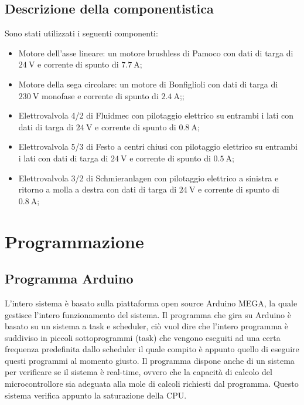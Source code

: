 \documentclass{report}
\begin{document}
\section{Descrizione della componentistica}
Sono stati utilizzati i seguenti componenti:
\begin{itemize}
\item Motore dell'asse lineare: un motore brushless di Pamoco con dati di targa di $\SI{24}{\volt}$ e corrente di spunto di $\SI{7,7}{\ampere}$;
\item Motore della sega circolare: un motore di Bonfiglioli con dati di targa di $\SI{230}{\volt}$ monofase e corrente di spunto di $\SI{2,4}{\ampere}$;;
\item Elettrovalvola 4/2 di Fluidmec con pilotaggio elettrico su entrambi i lati con dati di targa di $\SI{24}{\volt}$ e corrente di spunto di $\SI{0,8}{\ampere}$; 
\item Elettrovalvola 5/3 di Festo a centri chiusi con pilotaggio elettrico su entrambi i lati con dati di targa di $\SI{24}{\volt}$ e corrente di spunto di $\SI{0,5}{\ampere}$;
\item Elettrovalvola 3/2 di Schmieranlagen con pilotaggio elettrico a sinistra e ritorno a molla a destra con dati di targa di $\SI{24}{\volt}$ e corrente di spunto di $\SI{0,8}{\ampere}$;
\end{itemize} 

\chapter{Programmazione}
\section{Programma Arduino}
L'intero sistema è basato sulla piattaforma open source Arduino MEGA, la quale gestisce l'intero funzionamento del sistema. Il programma che gira su Arduino è basato su un sistema a task e scheduler, ciò vuol dire che l'intero programma è suddiviso in piccoli sottoprogrammi (task) che vengono eseguiti ad una certa frequenza predefinita dallo scheduler il quale compito è appunto quello di eseguire questi programmi al momento giusto. Il programma dispone anche di un sistema per verificare se il sistema è real-time, ovvero che la capacità di calcolo del microcontrollore sia adeguata alla mole di calcoli richiesti dal programma. Questo sistema verifica appunto la saturazione della CPU.
\end{document}
